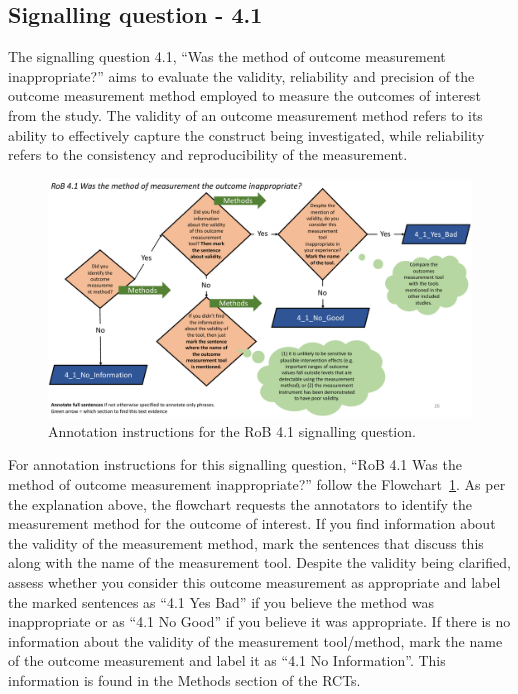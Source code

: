 \documentclass[sn-mathphys,Numbered]{sn-jnl}%
\begin{document}
\subsection*{Signalling question - 4.1 }
\label{subsec:4_1}
%
The signalling question 4.1, ``Was the method of outcome measurement inappropriate?'' aims to evaluate the validity, reliability and precision of the outcome measurement method employed to measure the outcomes of interest from the study.
The validity of an outcome measurement method refers to its ability to effectively capture the construct being investigated, while reliability refers to the consistency and reproducibility of the measurement.

%
%
%
\begin{figure}[hbt]
    \centering
    \includegraphics[width=\textwidth]{figures/4_1.pdf}
    \caption{Annotation instructions for the RoB 4.1 signalling question.}
    \label{fig:4_1}
\end{figure}
%
%
%


For annotation instructions for this signalling question, ``RoB 4.1 Was the method of outcome measurement inappropriate?'' follow the Flowchart~\ref{fig:4_1}.
As per the explanation above, the flowchart requests the annotators to identify the measurement method for the outcome of interest.
If you find information about the validity of the measurement method, mark the sentences that discuss this along with the name of the measurement tool.
Despite the validity being clarified, assess whether you consider this outcome measurement as appropriate and label the marked sentences as ``4.1 Yes Bad'' if you believe the method was inappropriate or as ``4.1 No Good'' if you believe it was appropriate.
If there is no information about the validity of the measurement tool/method, mark the name of the outcome measurement and label it as ``4.1 No Information''.
This information is found in the Methods section of the RCTs.
%
%
%
\end{document}
